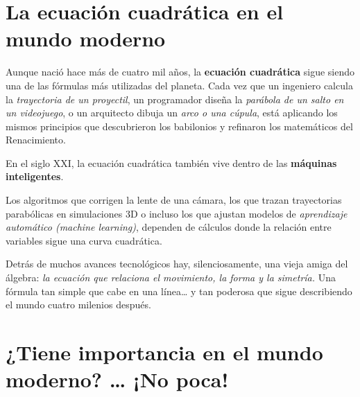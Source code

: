 \section*{La ecuación cuadrática en el mundo moderno}

\begin{reseñaplana}
Aunque nació hace más de cuatro mil años, la \textbf{ecuación cuadrática} sigue siendo una de las fórmulas 
más utilizadas del planeta.  
Cada vez que un ingeniero calcula la \textit{trayectoria de un proyectil}, un programador diseña 
la \textit{parábola de un salto en un videojuego}, o un arquitecto dibuja un \textit{arco o una cúpula}, 
está aplicando los mismos principios que descubrieron los babilonios y refinaron los matemáticos del Renacimiento.  

En el siglo XXI, la ecuación cuadrática también vive dentro de las \textbf{máquinas inteligentes}.

Los algoritmos que corrigen la lente de una cámara, los que trazan trayectorias parabólicas en 
simulaciones 3D o incluso los que ajustan modelos de \textit{aprendizaje automático (machine learning)}, 
dependen de cálculos donde la relación entre variables sigue una curva cuadrática.  

Detrás de muchos avances tecnológicos hay, silenciosamente, una vieja amiga del álgebra:  
\textit{la ecuación que relaciona el movimiento, la forma y la simetría.}  
Una fórmula tan simple que cabe en una línea… y tan poderosa que sigue describiendo el mundo cuatro milenios después.
\end{reseñaplana}

\section*{¿Tiene importancia en el mundo moderno? \ldots{} \textbf{¡No poca!}}


